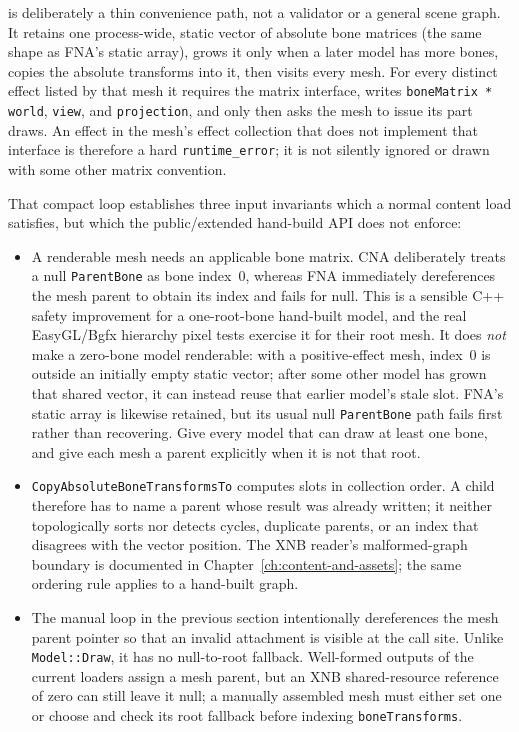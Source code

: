  is deliberately a thin convenience path, not a validator or a general
scene graph. It retains one process-wide, static vector of absolute bone matrices (the same
shape as FNA's static array), grows it only when a later model has more bones, copies the
absolute transforms into it, then visits every mesh. For every distinct effect listed by that
mesh it requires the matrix interface, writes
\texttt{boneMatrix * world}, \texttt{view}, and \texttt{projection}, and only then asks the mesh
to issue its part draws. An effect in the mesh's effect collection that does not implement that
interface is therefore a hard \texttt{runtime\_error}; it is not silently ignored or drawn with
some other matrix convention.

That compact loop establishes three input invariants which a normal content load satisfies, but
which the public/extended hand-build API does not enforce:

\begin{itemize}
  \item A renderable mesh needs an applicable bone matrix. CNA deliberately treats a null
        \texttt{ParentBone} as bone index~0, whereas FNA immediately dereferences the mesh
        parent to obtain its index and fails for null. This is a sensible C++ safety
        improvement for a one-root-bone hand-built model, and the real EasyGL/Bgfx hierarchy
        pixel tests exercise it for their root mesh. It does \emph{not} make a zero-bone model
        renderable: with a positive-effect mesh, index~0 is outside an initially empty static
        vector; after some other model has grown that shared vector, it can instead reuse that
        earlier model's stale slot. FNA's static array is likewise retained, but its usual null
        \texttt{ParentBone} path fails first rather than recovering. Give every model that can
        draw at least one bone, and give each mesh a parent explicitly when it is not that root.
  \item \texttt{CopyAbsoluteBoneTransformsTo} computes slots in collection order. A child
        therefore has to name a parent whose result was already written; it neither topologically
        sorts nor detects cycles, duplicate parents, or an index that disagrees with the vector
        position. The XNB reader's malformed-graph boundary is documented in
        Chapter~\ref{ch:content-and-assets}; the same ordering rule applies to a hand-built graph.
  \item The manual loop in the previous section intentionally dereferences the mesh parent
        pointer so that an invalid attachment is visible at the call site. Unlike
        \texttt{Model::Draw}, it has no null-to-root fallback. Well-formed
        outputs of the current loaders assign a mesh parent, but an XNB shared-resource reference
        of zero can still leave it null; a manually assembled mesh must either set one or choose
        and check its root fallback before indexing \texttt{boneTransforms}.
\end{itemize}

